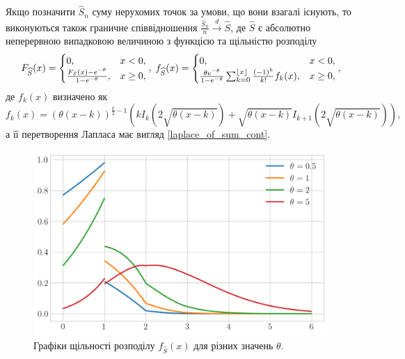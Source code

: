 \begin{theorem}
    Якщо позначити $\widehat{S}_n$ суму нерухомих точок за умови,
    що вони взагалі існують, то виконуються також граничне співвідношення
    $\frac{\widehat{S}_n}{n} \overset{d}{\longrightarrow} \widehat{S}$,
    де $\widehat{S}$ є абсолютно неперервною випадковою величиною з
    функцією та щільністю розподілу
    \begin{gather}
        F_{\widehat{S}}(x) = \begin{cases}
            0, & x < 0, \\
            \frac{F_{S}(x) - e^{-\theta}}{1 - e^{-\theta}}, & x \geq 0,
        \end{cases},\;
        f_{\widehat{S}}(x) = \begin{cases}
            0, & x < 0, \\
            \frac{\theta e^{-\theta}}{1 - e^{-\theta}}
            \sum_{k=0}^{\floor*{x}} \frac{(-1)^k}{k!} f_k(x), & x \geq 0,
        \end{cases},
    \end{gather}
    де $f_k(x)$ визначено як 
    $$f_k(x) = \left(\theta (x - k)\right)^{\frac{k}{2} - 1}
    \left(
        k I_k \left(2 \sqrt{\theta (x - k)} \right) + 
        \sqrt{\theta (x - k)} I_{k+1} \left(2 \sqrt{\theta (x - k)}\right)
    \right),$$
    а її перетворення Лапласа має вигляд \eqref{laplace_of_sum_cont}.
    \begin{figure}[H]
        \centering
        \includegraphics[scale=0.6]{plots/pdf_sum_hat.png}
        \caption{Графіки щільності розподілу $f_{\widehat{S}}(x)$ для різних значень $\theta$.}
    \end{figure}
\end{theorem}